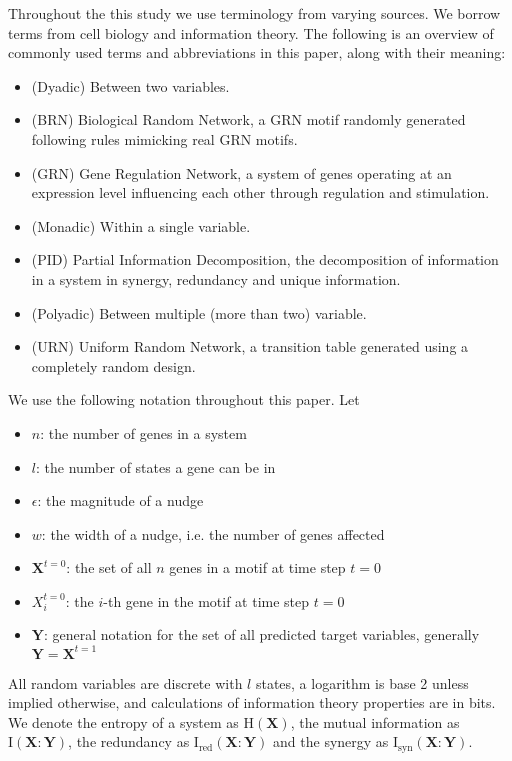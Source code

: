 \documentclass[../main.tex]{subfiles}
\begin{document}
Throughout the this study we use terminology from varying sources.
We borrow terms from cell biology and information theory.
The following is an overview of commonly used terms and abbreviations in this paper, along with their meaning:

\begin{itemize}
\item[] (Dyadic) Between two variables.
\item[] (BRN) Biological Random Network, a GRN motif randomly generated following rules mimicking real GRN motifs.
\item[] (GRN) Gene Regulation Network, a system of genes operating at an expression level influencing each other through regulation and stimulation.
\item[] (Monadic) Within a single variable.
\item[] (PID) Partial Information Decomposition, the decomposition of information in a system in synergy, redundancy and unique information.
\item[] (Polyadic) Between multiple (more than two) variable.
\item[] (URN) Uniform Random Network, a transition table generated using a completely random design.
\end{itemize}

We use the following notation throughout this paper. Let
\begin{itemize}
\item[] $n$: the number of genes in a system
\item[] $l$: the number of states a gene can be in
\item[] $\epsilon$: the magnitude of a nudge
\item[] $w$: the width of a nudge, i.e. the number of genes affected
\item[] $\mathbf{X}^{t=0}$: the set of all $n$ genes in a motif at time step $t=0$
\item[] $X_i^{t=0}$: the $i$-th gene in the motif at time step $t=0$
\item[] $\mathbf{Y}$: general notation for the set of all predicted target variables, generally $\mathbf{Y} = \mathbf{X}^{t=1}$
\end{itemize}
All random variables are discrete with $l$ states, a logarithm is base 2 unless implied otherwise, and calculations of information theory properties are in bits.
We denote the entropy of a system as $\mathrm{H}(\mathbf{X})$, the mutual information as $\mathrm{I}(\mathbf{X}:\mathbf{Y})$, the redundancy as $\mathrm{I}_\mathrm{red}(\mathbf{X}:\mathbf{Y})$ and the synergy as $\mathrm{I}_\mathrm{syn}(\mathbf{X}:\mathbf{Y})$.
\end{document}
